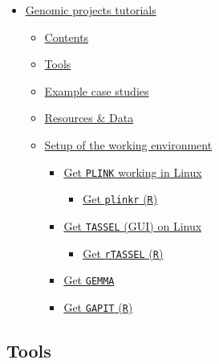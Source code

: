 \begin{itemize}
\tightlist
\item
  \protect\hyperlink{genomic-projects-tutorials}{Genomic projects
  tutorials}

  \begin{itemize}
  \tightlist
  \item
    \protect\hyperlink{contents}{Contents}
  \item
    \protect\hyperlink{tools}{Tools}
  \item
    \protect\hyperlink{example-case-studies}{Example case studies}
  \item
    \protect\hyperlink{resources--data}{Resources \& Data}
  \item
    \protect\hyperlink{setup-of-the-working-environment}{Setup of the
    working environment}

    \begin{itemize}
    \tightlist
    \item
      \protect\hyperlink{get-plink-working-in-linux}{Get \texttt{PLINK}
      working in Linux}

      \begin{itemize}
      \tightlist
      \item
        \protect\hyperlink{get-plinkr-r}{Get \texttt{plinkr}
        (\texttt{R})}
      \end{itemize}
    \item
      \protect\hyperlink{get-tassel-gui-on-linux}{Get \texttt{TASSEL}
      (GUI) on Linux}

      \begin{itemize}
      \tightlist
      \item
        \protect\hyperlink{get-rtassel-r}{Get \texttt{rTASSEL}
        (\texttt{R})}
      \end{itemize}
    \item
      \protect\hyperlink{get-gemma}{Get \texttt{GEMMA}}
    \item
      \protect\hyperlink{get-gapit-r}{Get \texttt{GAPIT} (\texttt{R})}
    \end{itemize}
  \end{itemize}
\end{itemize}

\hypertarget{tools}{%
\subsection{Tools}\label{tools}}

